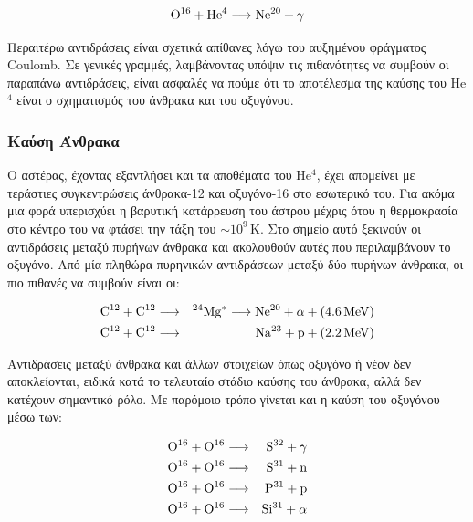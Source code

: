\begin{eqnarray}
\rm O^{16} + He^4 \longrightarrow \rm Ne^{20} + \gamma \label{eq:o16+he4_ne20+gamma}
\end{eqnarray}

Περαιτέρω αντιδράσεις είναι σχετικά απίθανες λόγω του αυξημένου φράγματος Coulomb. Σε γενικές γραμμές, λαμβάνοντας υπόψιν τις πιθανότητες να συμβούν οι παραπάνω αντιδράσεις, είναι ασφαλές να πούμε ότι το αποτέλεσμα της καύσης του He$^4$ είναι ο σχηματισμός του άνθρακα και του οξυγόνου.
\subsubsection{Καύση Άνθρακα}
Ο αστέρας, έχοντας εξαντλήσει και τα αποθέματα του He$^4$, έχει απομείνει με τεράστιες συγκεντρώσεις άνθρακα-12 και οξυγόνο-16 στο εσωτερικό του. Για ακόμα μια φορά υπερισχύει η βαρυτική κατάρρευση του άστρου μέχρις ότου η θερμοκρασία στο κέντρο του να φτάσει την τάξη του $\sim 10^9 \,\text{K}$. Στο σημείο αυτό ξεκινούν οι αντιδράσεις μεταξύ πυρήνων άνθρακα και ακολουθούν αυτές που περιλαμβάνουν το οξυγόνο.
Από μία πληθώρα πυρηνικών αντιδράσεων μεταξύ δύο πυρήνων άνθρακα, οι πιο πιθανές να συμβούν είναι οι:

\begin{eqnarray}
\rm C^{12} + C^{12} & \longrightarrow & \rm  ^{24}Mg^{*} \longrightarrow Ne^{20} + \alpha + (4.6 \,\text{MeV}) \label{eq:c12+c12_mg24_ne20+alpha+q}\\
\rm C^{12} + C^{12} & \longrightarrow & \rm Na^{23} + p + (2.2 \,\text{MeV}) \label{eq:c12+c12_na23+p+q}
\end{eqnarray}

Αντιδράσεις μεταξύ άνθρακα και άλλων στοιχείων όπως οξυγόνο ή νέον δεν αποκλείονται, ειδικά κατά το τελευταίο στάδιο καύσης του άνθρακα, αλλά δεν κατέχουν σημαντικό ρόλο. Με παρόμοιο τρόπο γίνεται και η καύση του οξυγόνου μέσω των:

\begin{eqnarray}
\rm O^{16} + O^{16} & \longrightarrow & \rm S^{32} + \gamma  \label{eq:o16+o16_s32}\\
\rm O^{16} + O^{16} & \longrightarrow & \rm S^{31} + n \label{eq:o16+o16_s31+n}\\
\rm O^{16} + O^{16} & \longrightarrow & \rm P^{31} + p \label{eq:o16+o16_p31+p}\\
\rm O^{16} + O^{16} & \longrightarrow & \rm Si^{31} + \alpha \label{eq:o16+o16_si31+alpha}
\end{eqnarray}

